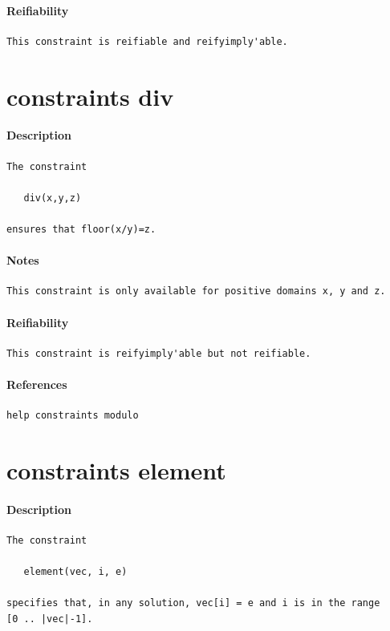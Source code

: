 \documentclass[oneside]{book}
\begin{document}
\paragraph{Reifiability}
{\footnotesize
\begin{verbatim}
This constraint is reifiable and reifyimply'able.
\end{verbatim}
}
\section{constraints div}
\paragraph{Description}
{\footnotesize
\begin{verbatim}
The constraint
 
   div(x,y,z)

ensures that floor(x/y)=z.
\end{verbatim}
}
\paragraph{Notes}
{\footnotesize
\begin{verbatim}
This constraint is only available for positive domains x, y and z.
\end{verbatim}
}
\paragraph{Reifiability}
{\footnotesize
\begin{verbatim}
This constraint is reifyimply'able but not reifiable.
\end{verbatim}
}
\paragraph{References}
{\footnotesize
\begin{verbatim}
help constraints modulo
\end{verbatim}
}
\section{constraints element}
\paragraph{Description}
{\footnotesize
\begin{verbatim}
The constraint 

   element(vec, i, e)

specifies that, in any solution, vec[i] = e and i is in the range 
[0 .. |vec|-1].
\end{verbatim}
}
\end{document}
